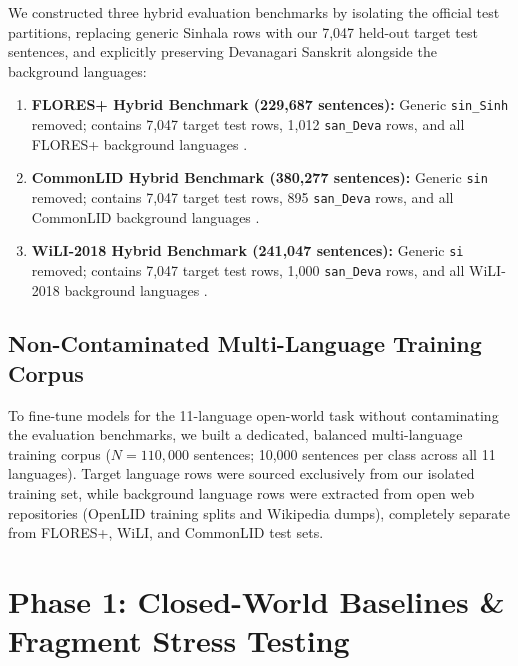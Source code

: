 \documentclass[11pt]{article}
\begin{document}
We constructed three hybrid evaluation benchmarks by isolating the official test partitions, replacing generic Sinhala rows with our 7,047 held-out target test sentences, and explicitly preserving Devanagari Sanskrit alongside the background languages:
\begin{enumerate}
    \item \textbf{FLORES+ Hybrid Benchmark (229,687 sentences):} Generic \texttt{sin\_Sinh} removed; contains 7,047 target test rows, 1,012 \texttt{san\_Deva} rows, and all FLORES+ background languages \cite{goyal2022flores}.
    \item \textbf{CommonLID Hybrid Benchmark (380,277 sentences):} Generic \texttt{sin} removed; contains 7,047 target test rows, 895 \texttt{san\_Deva} rows, and all CommonLID background languages \cite{dunn2023commonlid}.
    \item \textbf{WiLI-2018 Hybrid Benchmark (241,047 sentences):} Generic \texttt{si} removed; contains 7,047 target test rows, 1,000 \texttt{san\_Deva} rows, and all WiLI-2018 background languages \cite{thoma2018wili}.
\end{enumerate}

\subsection{Non-Contaminated Multi-Language Training Corpus}
To fine-tune models for the 11-language open-world task without contaminating the evaluation benchmarks, we built a dedicated, balanced multi-language training corpus ($N=110,000$ sentences; 10,000 sentences per class across all 11 languages). Target language rows were sourced exclusively from our isolated training set, while background language rows were extracted from open web repositories (OpenLID training splits and Wikipedia dumps), completely separate from FLORES+, WiLI, and CommonLID test sets.

\section{Phase 1: Closed-World Baselines \& Fragment Stress Testing}
\end{document}

